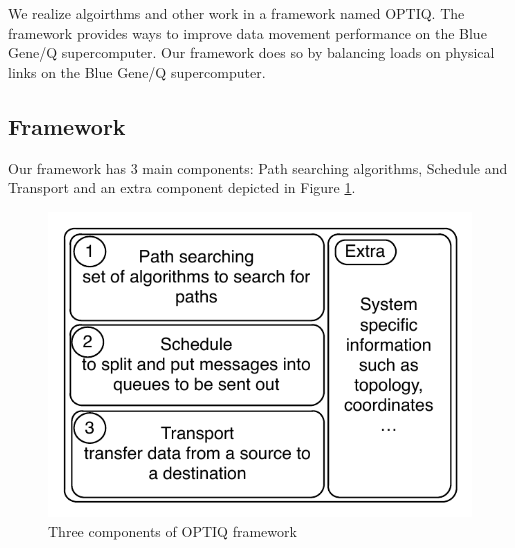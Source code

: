 We realize algoirthms and other work in a framework named OPTIQ. The framework provides ways to improve data movement performance on the Blue Gene/Q supercomputer. Our framework does so by balancing loads on physical links on the Blue Gene/Q supercomputer.

\subsection{Framework}

Our framework has 3 main components: Path searching algorithms, Schedule and Transport and an extra component depicted in Figure \ref{fig:framework}.

\begin{figure}[!htb]
\vspace{-0.1in}
\centering
\includegraphics[scale=0.7]{figures/framework.pdf}
\vspace{-0.2in}
\caption{Three components of OPTIQ framework}
\vspace{-0.1in}
\label{fig:framework}
\end{figure}

